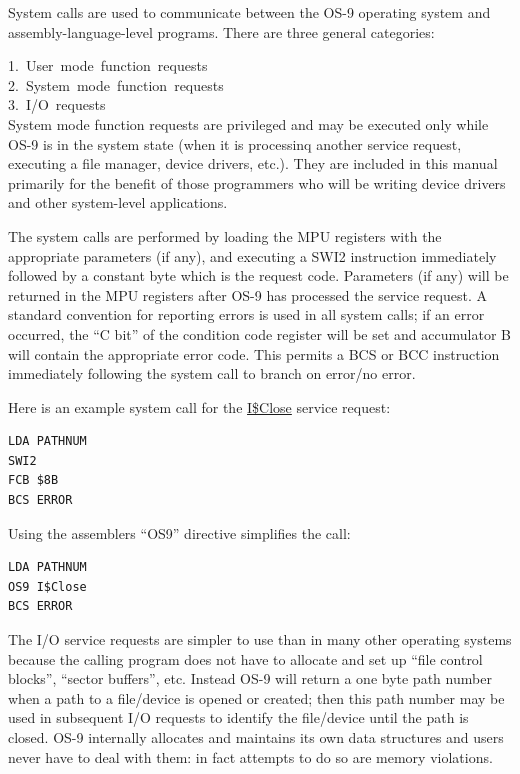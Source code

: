 \documentclass[
]{article}
\begin{document}
System calls are used to communicate between the OS-9 operating system
and assembly-language-level programs. There are three general
categories:

1.~User~mode~function~requests\\
2.~System~mode~function~requests\\
3.~I/O~requests\\

System mode function requests are privileged and may be executed only
while OS-9 is in the system state (when it is processinq another service
request, executing a file manager, device drivers, etc.). They are
included in this manual primarily for the benefit of those programmers
who will be writing device drivers and other system-level applications.

The system calls are performed by loading the MPU registers with the
appropriate parameters (if any), and executing a SWI2 instruction
immediately followed by a constant byte which is the request code.
Parameters (if any) will be returned in the MPU registers after OS-9 has
processed the service request. A standard convention for reporting
errors is used in all system calls; if an error occurred, the ``C bit''
of the condition code register will be set and accumulator B will
contain the appropriate error code. This permits a BCS or BCC
instruction immediately following the system call to branch on error/no
error.

Here is an example system call for the \hyperref[i.close]{I\$Close}
service request:

\begin{verbatim}
LDA PATHNUM 
SWI2 
FCB $8B 
BCS ERROR 
\end{verbatim}

Using the assembler\textquotesingle s ``OS9'' directive simplifies the
call:

\begin{verbatim}
LDA PATHNUM 
OS9 I$Close 
BCS ERROR 
\end{verbatim}

The I/O service requests are simpler to use than in many other operating
systems because the calling program does not have to allocate and set up
``file control blocks'', ``sector buffers'', etc. Instead OS-9 will
return a one byte path number when a path to a file/device is opened or
created; then this path number may be used in subsequent I/O requests to
identify the file/device until the path is closed. OS-9 internally
allocates and maintains its own data structures and users never have to
deal with them: in fact attempts to do so are memory violations.
\end{document}

